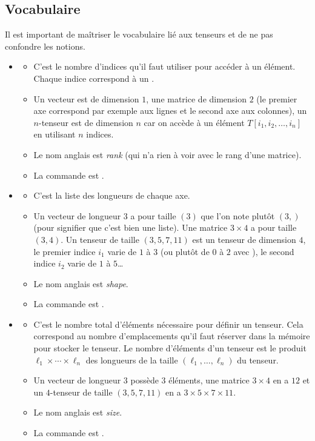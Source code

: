 \documentclass[11pt,class=report,crop=false]{standalone}
\begin{document}
\subsection{Vocabulaire}


Il est important de maîtriser le vocabulaire lié aux tenseurs et de ne pas confondre les notions.

\begin{itemize}
  \item {} 
  \begin{itemize}
    \item C'est le nombre d'indices qu'il faut utiliser pour accéder à un élément. 
    Chaque indice correspond à un .
    \item Un vecteur est de dimension $1$, une matrice de dimension $2$ (le premier axe correspond par exemple aux lignes et le second axe aux colonnes), un $n$-tenseur est de dimension $n$ car on accède à un élément $T[i_1,i_2,\ldots,i_n]$ en utilisant $n$ indices.
    \item Le nom anglais est \emph{rank} (qui n'a rien à voir avec le rang d'une matrice).   
    \item La commande est .
 \end{itemize}
  
  \item {}
    \begin{itemize}
      \item C'est la liste des longueurs de chaque axe.
      \item Un vecteur de longueur $3$ a pour taille $(3)$ que l'on note plutôt $(3,)$ (pour signifier que c'est bien une liste). Une matrice $3\times 4$ a pour taille $(3,4)$. Un tenseur de taille $(3,5,7,11)$ est un tenseur de dimension $4$, le premier indice $i_1$ varie de $1$ à $3$ (ou plutôt de $0$ à $2$ avec \Python), le second indice $i_2$ varie de $1$ à $5$\ldots
      \item Le nom anglais est \emph{shape}.     
      \item La commande est .
    \end{itemize}
    
  
  \item {}
    \begin{itemize}
      \item C'est le nombre total d'éléments nécessaire pour définir un tenseur. Cela correspond au nombre d'emplacements qu'il faut réserver dans la mémoire pour stocker le tenseur. Le nombre d'éléments d'un tenseur est le produit $\ell_1 \times \cdots \times \ell_n$ des longueurs de la taille $(\ell_1,\ldots,\ell_n)$ du tenseur.
      \item Un vecteur de longueur $3$ possède $3$ éléments, une matrice $3\times 4$ en a $12$ et un $4$-tenseur de taille $(3,5,7,11)$ en a $3\times5\times7\times 11$.
      \item Le nom anglais est \emph{size}.       
      \item La commande est .


\end{itemize}
\end{itemize}
\end{document}

